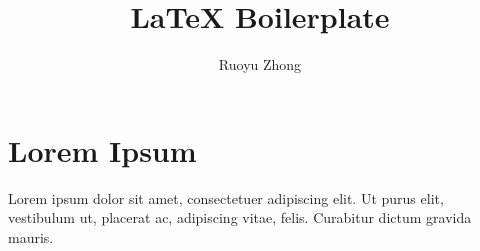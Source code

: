 \documentclass{article}
\title{LaTeX Boilerplate}
\author{Ruoyu Zhong}
\date{}
\begin{document}
\maketitle

\section{Lorem Ipsum}

Lorem ipsum dolor sit amet, consectetuer adipiscing elit.
Ut purus elit, vestibulum ut, placerat ac, adipiscing vitae, felis.
Curabitur dictum gravida mauris.
\end{document}
